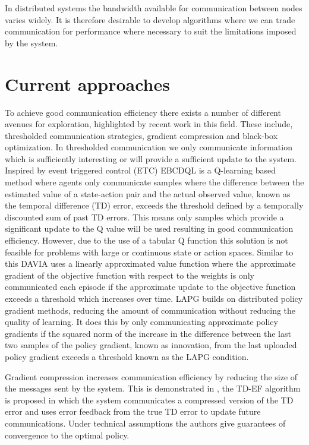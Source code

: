 In distributed systems the bandwidth available for communication between nodes varies widely. It is therefore desirable to develop algorithms where we can trade communication for performance where necessary to suit the limitations imposed by the system.

\section{Current approaches}
\label{sec:CurrentApproaches}
To achieve good communication efficiency there exists a number of different avenues for exploration, highlighted by recent work in this field. These include, thresholded communication strategies, gradient compression and black-box optimization.
In thresholded communication we only communicate information which is sufficiently interesting or will provide a sufficient update to the system. Inspired by event triggered control (ETC) EBCDQL \cite{EBCDQL} is a Q-learning based method where agents only communicate samples where the difference between the estimated value of a state-action pair and the actual observed value, known as the temporal difference (TD) error, exceeds the threshold defined by a temporally discounted sum of past TD errors. This means only samples which provide a significant update to the Q value will be used resulting in good communication efficiency. 
However, due to the use of a tabular Q function this solution is not feasible for problems with large or continuous state or action spaces.
Similar to this DAVIA \cite{DAVIA} uses a linearly approximated value function where the approximate gradient of the objective function with respect to the weights is only communicated each episode if the approximate update to the objective function exceeds a threshold which increases over time. 
LAPG \cite{LAPG} builds on distributed policy gradient methods, reducing the amount of communication without reducing the quality of learning. It does this by only communicating approximate policy gradients if the squared norm of the increase in the difference between the last two samples of the policy gradient, known as innovation, from the last uploaded policy gradient exceeds a threshold known as the LAPG condition.

Gradient compression increases communication efficiency by reducing the size of the messages sent by the system. This is demonstrated in \cite{TDCompression}, the TD-EF algorithm is proposed in which the system communicates a compressed version of the TD error and uses error feedback from the true TD error to update future communications. Under technical assumptions the authors give guarantees of convergence to the optimal policy.

